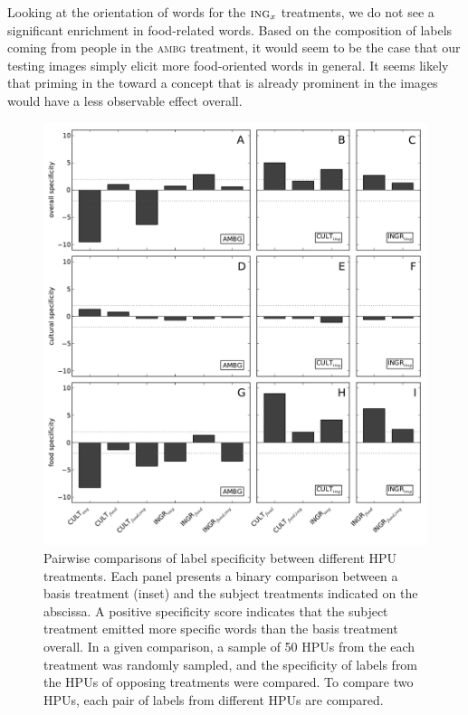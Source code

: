 \documentclass[letterpaper]{article}
\begin{document}
Looking at the orientation of words for the $\textsc{ing}_{x}$ treatments, 
we do not see a significant enrichment in food-related words.
Based on the composition of labels coming from people in the \textsc{ambg} 
treatment, it would seem to be the case that our testing images simply elicit
more food-oriented words in general.  It seems likely that priming in the
toward a concept that is already prominent in the images would 
have a less observable effect overall.


\begin{figure}
	\begin{center}
	\includegraphics[scale=0.55]{../figs/specificity2.pdf}
	\caption{Pairwise comparisons of label specificity between different 
	HPU treatments.  Each panel presents a binary comparison between a 
	basis treatment (inset) and the subject treatments indicated on the 
	abscissa.  A positive specificity score indicates that the subject 
	treatment emitted more specific words than the basis treatment overall.
	In a given comparison, a sample of 50 HPUs from the   
	each treatment was randomly sampled, and the specificity of labels from
	the HPUs of opposing treatments were compared.
	To compare two HPUs, each pair of labels from different HPUs are compared.
}
\end{center}
\end{figure}
\end{document}
